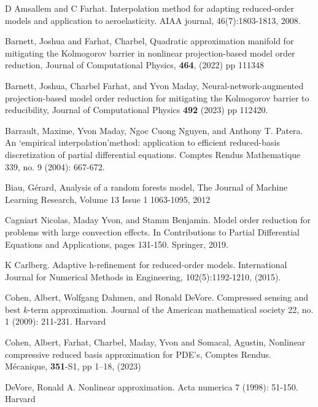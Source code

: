 \begin{thebibliography}{99}

D Amsallem and C Farhat. Interpolation method for adapting reduced-order models and application to aeroelasticity. AIAA journal, 46(7):1803-1813, 2008.


  Barnett, Joshua and Farhat, Charbel,
  Quadratic approximation manifold for mitigating the Kolmogorov barrier in nonlinear projection-based model order reduction, Journal of Computational Physics, {\bf 464}, (2022) pp 111348

Barnett, Joshua, Charbel Farhat, and Yvon Maday, Neural-network-augmented projection-based model order reduction for mitigating the Kolmogorov barrier to reducibility, Journal of Computational Physics {\bf 492} (2023) pp 112420.


Barrault, Maxime, Yvon Maday, Ngoc Cuong Nguyen, and Anthony T. Patera. An ‘empirical interpolation'method: application to efficient reduced-basis discretization of partial differential equations. Comptes Rendus Mathematique 339, no. 9 (2004): 667-672.



Biau, Gérard, Analysis of a random forests model, The Journal of Machine Learning Research, Volume 13 Issue 1 1063-1095, 2012

Cagniart Nicolas, Maday Yvon, and Stamm Benjamin. Model order reduction for problems with
large convection effects. In Contributions to Partial Differential Equations and
Applications, pages 131-150. Springer, 2019.

K Carlberg. Adaptive h-refinement for reduced-order models. International Journal for Numerical Methods in Engineering, 102(5):1192-1210, (2015).

Cohen, Albert, Wolfgang Dahmen, and Ronald DeVore. Compressed sensing and best $k$-term approximation. Journal of the American mathematical society 22, no. 1 (2009): 211-231.
Harvard	


Cohen, Albert, Farhat, Charbel, Maday, Yvon and Somacal, Agustin, Nonlinear compressive reduced basis approximation for PDE's, Comptes Rendus. M{\'e}canique, {\bf 351}-S1, pp 1--18, (2023)


DeVore, Ronald A. Nonlinear approximation. Acta numerica 7 (1998): 51-150.
Harvard	



\end{thebibliography}

